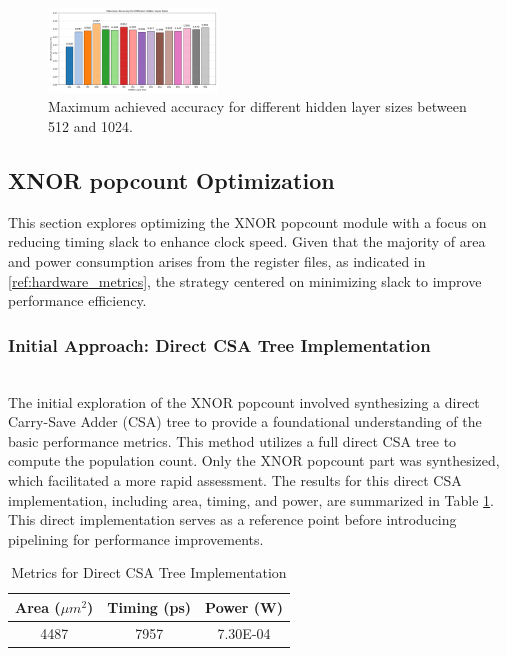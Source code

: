 \documentclass[conference]{IEEEtran}
\begin{document}
\begin{figure}[h]
    \centering
    \includegraphics[width=0.4\textwidth]{Different_hidden_layer_sizes_512_1024.png}
    \caption{Maximum achieved accuracy for different hidden layer sizes between 512 and 1024.}
    \label{fig:bar_max_achieved_accuracy}
\end{figure}

\subsection{XNOR popcount Optimization}
\label{ref:xnor_popcount}

This section explores optimizing the XNOR popcount module with a focus on reducing timing slack to enhance clock speed. Given that the majority of area and power consumption arises from the register files, as indicated in \ref{ref:hardware_metrics}, the strategy centered on minimizing slack to improve performance efficiency.

\subsubsection{Initial Approach: Direct CSA Tree Implementation}
\hfill\\

The initial exploration of the XNOR popcount involved synthesizing a direct Carry-Save Adder (CSA) tree to provide a foundational understanding of the basic performance metrics. This method utilizes a full direct CSA tree to compute the population count. Only the XNOR popcount part was synthesized, which facilitated a more rapid assessment. The results for this direct CSA implementation, including area, timing, and power, are summarized in Table \ref{tab:direct_csa}. This direct implementation serves as a reference point before introducing pipelining for performance improvements.


\begin{table}[h]
    \centering
    \caption{Metrics for Direct CSA Tree Implementation}
    \label{tab:direct_csa}
    \begin{tabular}{@{}ccc@{}}
        \toprule
        \textbf{Area ($\mu m^2$)} & \textbf{Timing (ps)} & \textbf{Power (W)} \\
        \midrule
          4487 & 7957 & 7.30E-04 \\
        \bottomrule
    \end{tabular}
\end{table}
\end{document}
